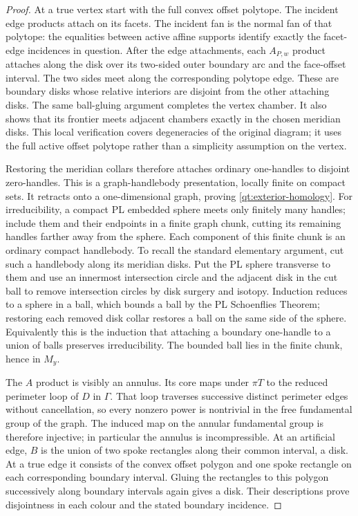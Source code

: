 \begin{proof}
At a true vertex start with the full convex offset polytope.  The
incident edge products attach on its facets.  The incident fan is the
normal fan of that polytope: the equalities between active affine
supports identify exactly the facet-edge incidences in question.
After the edge attachments, each $A_{P,w}$ product attaches along the
disk over its two-sided outer boundary arc and the face-offset
interval.  The two sides meet along the corresponding polytope edge.
These are boundary disks whose relative interiors are disjoint from
the other attaching disks.  The same ball-gluing argument completes
the vertex chamber.  It also shows that its frontier meets adjacent
chambers exactly in the chosen meridian disks.  This local verification
covers degeneracies of the original diagram; it uses the full active
offset polytope rather than a simplicity assumption on the vertex.

Restoring the meridian collars therefore attaches ordinary
one-handles to disjoint zero-handles.  This is a graph-handlebody
presentation, locally finite on compact sets.  It retracts onto a
one-dimensional graph, proving \eqref{qt:exterior-homology}.
For irreducibility, a compact PL embedded sphere meets only finitely many handles;
include them and their endpoints in a finite graph chunk, cutting its
remaining handles farther away from the sphere.  Each component of
this finite chunk is an ordinary compact handlebody.  To recall the
standard elementary argument, cut such a handlebody along its
meridian disks.  Put the PL sphere transverse to them and use an innermost
intersection circle and the adjacent disk in the cut ball to remove
intersection circles by disk surgery and isotopy.  Induction reduces
to a sphere in a ball, which bounds a ball by the PL Schoenflies
Theorem; restoring each removed disk collar restores a ball on the
same side of the sphere.  Equivalently this is the induction that
attaching a boundary one-handle to a union of balls preserves
irreducibility.  The bounded ball lies in the finite chunk, hence in
$M_y$.

The $A$ product is visibly an annulus.  Its core maps under $\pi T$
to the reduced perimeter loop of $D$ in $\Gamma$.  That loop traverses
successive distinct perimeter edges without cancellation, so every
nonzero power is nontrivial in the free fundamental group of the
graph.  The induced map on the annular fundamental group is therefore
injective; in particular the annulus is incompressible.
At an artificial edge, $B$ is the union of two spoke rectangles along
their common interval, a disk.  At a true edge it consists of the
convex offset polygon and one spoke rectangle on each corresponding
boundary interval.  Gluing the rectangles to this polygon successively
along boundary intervals again gives a disk.  Their descriptions
prove disjointness in each colour and the stated boundary incidence.


\end{proof}
